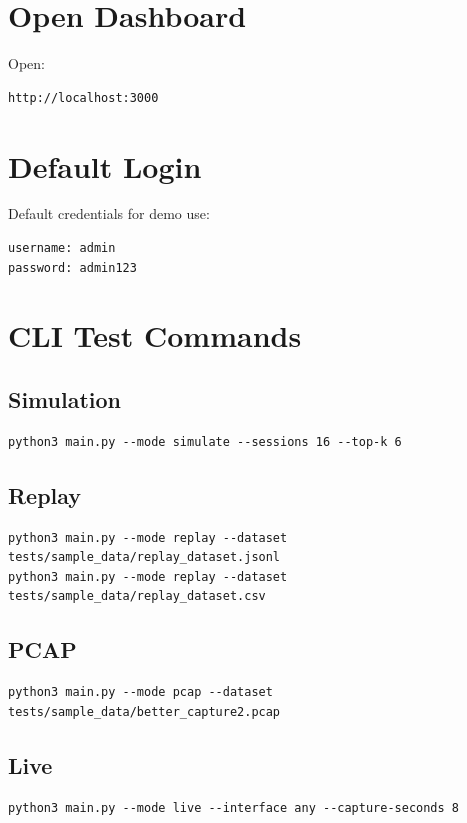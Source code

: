 \documentclass[12pt,a4paper]{report}
\begin{document}
\section{Open Dashboard}
Open:
\begin{lstlisting}[style=codeblock]
http://localhost:3000
\end{lstlisting}

\section{Default Login}
Default credentials for demo use:
\begin{lstlisting}[style=codeblock]
username: admin
password: admin123
\end{lstlisting}

\section{CLI Test Commands}
\subsection*{Simulation}
\begin{lstlisting}[style=codeblock]
python3 main.py --mode simulate --sessions 16 --top-k 6
\end{lstlisting}

\subsection*{Replay}
\begin{lstlisting}[style=codeblock]
python3 main.py --mode replay --dataset tests/sample_data/replay_dataset.jsonl
python3 main.py --mode replay --dataset tests/sample_data/replay_dataset.csv
\end{lstlisting}

\subsection*{PCAP}
\begin{lstlisting}[style=codeblock]
python3 main.py --mode pcap --dataset tests/sample_data/better_capture2.pcap
\end{lstlisting}

\subsection*{Live}
\begin{lstlisting}[style=codeblock]
python3 main.py --mode live --interface any --capture-seconds 8
\end{lstlisting}
\end{document}
